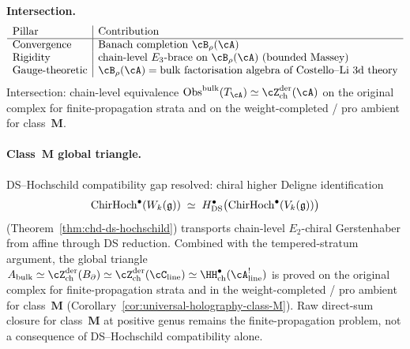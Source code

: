 \smallskip\textbf{Intersection.}
\[
\begin{array}{l|l}
\text{Pillar} & \text{Contribution} \\
\hline
\text{Convergence} &
 \text{Banach completion } \cB_\rho(\cA) \\
\text{Rigidity} &
 \text{chain-level } E_3\text{-brace on } \cB_\rho(\cA)
 \text{ (bounded Massey)} \\
\text{Gauge-theoretic} &
 \cB_\rho(\cA) = \text{bulk factorisation algebra of
 Costello--Li 3d theory}
\end{array}
\]
Intersection: chain-level equivalence
$\mathrm{Obs}^{\mathrm{bulk}}(T_\cA) \simeq
\cZ^{\mathrm{der}}_{\mathrm{ch}}(\cA)$ on the original complex for
finite-propagation strata and on the weight-completed / pro ambient
for class~$\mathbf{M}$.

\paragraph{Class~$\mathbf{M}$ global triangle.}
DS--Hochschild compatibility gap resolved: chiral higher Deligne
identification
\[
\mathrm{ChirHoch}^\bullet(W_k(\mathfrak{g}))
\;\simeq\;
H^\bullet_{\mathrm{DS}}\bigl(\mathrm{ChirHoch}^\bullet(V_k(\mathfrak{g}))\bigr)
\]
(Theorem~\ref{thm:chd-ds-hochschild}) transports chain-level
$E_2$-chiral Gerstenhaber from affine through DS reduction.
Combined with the tempered-stratum argument, the global triangle
$\Abulk \simeq \cZ^{\mathrm{der}}_{\mathrm{ch}}(\Bbound) \simeq
\cZ^{\mathrm{der}}_{\mathrm{ch}}(\cC_{\mathrm{line}}) \simeq
\HH^\bullet_{\mathrm{ch}}(\cA^!_{\mathrm{line}})$ is proved on the
original complex for finite-propagation strata and in the
weight-completed / pro ambient for class~$\mathbf{M}$
(Corollary~\ref{cor:universal-holography-class-M}). Raw direct-sum
closure for class~$\mathbf{M}$ at positive genus remains the
finite-propagation problem, not a consequence of DS--Hochschild
compatibility alone.

